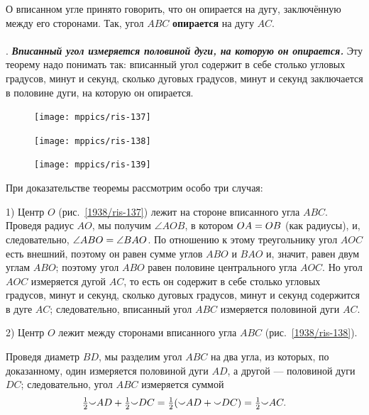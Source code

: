 \documentclass[oneside]{book}
\makeatletter
\newcommand{\rindex}[2][\imki@jobname]{%
  \index[#1]{\detokenize{#2}}%
}
\makeatother
\begin{document}
О вписанном угле принято говорить, что он опирается на дугу, заключённую между его сторонами.
Так, угол $ABC$ \rindex{опирается на дугу}\textbf{опирается} на дугу $AC$.

\paragraph{}\label{1938/124} %
.
\textbf{\emph{Вписанный угол измеряется половиной дуги, на которую он опирается.}}
Эту теорему надо понимать так:
вписанный угол содержит в себе столько угловых градусов, минут и секунд, сколько дуговых градусов, минут и секунд заключается в половине дуги, на которую он опирается.

\begin{figure}[h]
\begin{minipage}{.32\textwidth}
\centering
\texttt{[image: mppics/ris-137]}
\caption{}\label{1938/ris-137}
\end{minipage}
\hfill
\begin{minipage}{.32\textwidth}
\centering
\texttt{[image: mppics/ris-138]}
\caption{}\label{1938/ris-138}
\end{minipage}
\hfill
\begin{minipage}{.32\textwidth}
\centering
\texttt{[image: mppics/ris-139]}
\caption{}\label{1938/ris-139}
\end{minipage}
\end{figure}

При доказательстве теоремы рассмотрим особо три случая:

1) Центр $O$ (рис.~\ref{1938/ris-137}) лежит на стороне вписанного угла $ABC$.
Проведя радиус $AO$, мы получим $\angle AOB$, в котором $OA \z= OB$ (как радиусы), и, следовательно, $\angle ABO\z=\angle BAO$.
По отношению к этому треугольнику угол $AOC$ есть внешний, поэтому он равен сумме углов $ABO$ и $BAO$ и, значит, равен двум углам $ABO$;
поэтому угол $ABO$ равен половине центрального угла $AOC$.
Но угол $AOC$ измеряется дугой $AC$, то есть
он содержит в себе столько угловых градусов, минут и секунд, сколько дуговых градусов, минут и секунд содержится в дуге $AC$;
следовательно, вписанный угол $ABC$ измеряется половиной дуги $AC$.

2) Центр $O$ лежит между сторонами вписанного угла $ABC$ (рис.~\ref{1938/ris-138}).

Проведя диаметр $BD$, мы разделим угол $ABC$ на два угла, из которых, по доказанному, один измеряется половиной дуги $AD$, а другой — половиной дуги $DC$;
следовательно, угол $ABC$ измеряется суммой
\[\tfrac12{\smallsmile}AD\z+\tfrac12{\smallsmile}DC=\tfrac12({\smallsmile}AD\z+{\smallsmile}DC)=\tfrac12{\smallsmile}AC.\]
\end{document}
